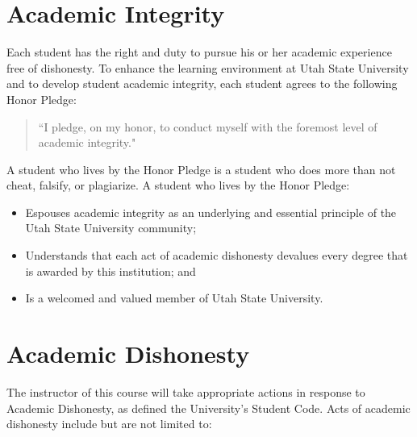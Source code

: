 \documentclass[11pt]{article}\usepackage[]{graphicx}\usepackage[]{xcolor}
\begin{document}
\section{Academic Integrity}

Each student has the right and duty to pursue his or her academic experience free of dishonesty. 
To enhance the learning environment at Utah State University and to develop student academic integrity, each student agrees to the following Honor Pledge:

\begin{quote}
``I pledge, on my honor, to conduct myself with the foremost level of academic integrity."
\end{quote}

A student who lives by the Honor Pledge is a student who does more than not cheat, falsify, or plagiarize.
A student who lives by the Honor Pledge:
\begin{itemize}
  \item Espouses academic integrity as an underlying and essential principle of the Utah State University community;
  \item Understands that each act of academic dishonesty devalues every degree that is awarded by this institution; and
  \item Is a welcomed and valued member of Utah State University.
\end{itemize}

\section{Academic Dishonesty}

The instructor of this course will take appropriate actions in response to Academic Dishonesty, as defined the University’s Student Code. 
Acts of academic dishonesty include but are not limited to:
\end{document}
